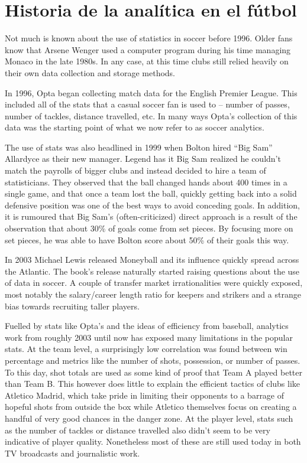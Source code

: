 \section{Historia de la analítica en el fútbol}

Not much is known about the use of statistics in soccer before 1996. Older 
fans know that Arsene Wenger used a computer program during his time 
managing Monaco in the late 1980s. In any case, at this time clubs still 
relied heavily on their own data collection and storage methods.

In 1996, Opta began collecting match data for the English Premier League. 
This included all of the stats that a casual soccer fan is used to – number 
of passes, number of tackles, distance travelled, etc. In many ways Opta’s 
collection of this data was the starting point of what we now refer to as 
soccer analytics.

The use of stats was also headlined in 1999 when Bolton hired “Big Sam” Allardyce 
as their new manager. Legend has it Big Sam realized he couldn’t match 
the payrolls of bigger clubs and instead decided to hire a team of 
statisticians. They observed that the ball changed hands about 400 
times in a single game, and that once a team lost the ball, quickly 
getting back into a solid defensive position was one of the best ways 
to avoid conceding goals. In addition, it is rumoured that Big Sam’s 
(often-criticized) direct approach is a result of the observation that 
about 30\% of goals come from set pieces. By focusing more on set pieces, 
he was able to have Bolton score about 50\% of their goals this way.

In 2003 Michael Lewis released Moneyball and its influence quickly spread 
across the Atlantic. The book’s release naturally started raising questions 
about the use of data in soccer. A couple of transfer market irrationalities 
were quickly exposed, most notably the salary/career length ratio for keepers 
and strikers and a strange bias towards recruiting taller players.

Fuelled by stats like Opta’s and the ideas of efficiency from baseball, 
analytics work from roughly 2003 until now has exposed many limitations 
in the popular stats. At the team level, a surprisingly low correlation 
was found between win percentage and metrics like the number of shots, 
possession, or number of passes. To this day, shot totals are used as 
some kind of proof that Team A played better than Team B. This however 
does little to explain the efficient tactics of clubs like Atletico Madrid, 
which take pride in limiting their opponents to a barrage of hopeful shots 
from outside the box while Atletico themselves focus on creating a handful 
of very good chances in the danger zone. At the player level, stats such as 
the number of tackles or distance travelled also didn’t seem to be very 
indicative of player quality. Nonetheless most of these are still used 
today in both TV broadcasts and journalistic work.


